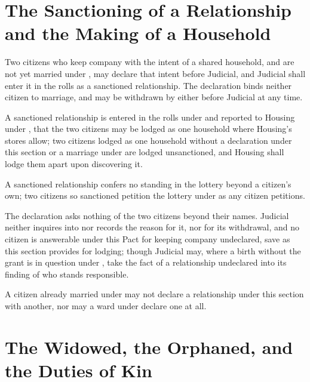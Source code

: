\section{The Sanctioning of a Relationship and the Making of a Household}
\label{sec:marriage:sanctioning-of-a-relationship-and-the-making-of-a-household}

Two citizens who keep company with the intent of a shared household, and are not yet married under , may declare that intent before Judicial, and Judicial shall enter it in the rolls as a sanctioned relationship. The declaration binds neither citizen to marriage, and may be withdrawn by either before Judicial at any time.

\begin{clauses}
\item A sanctioned relationship is entered in the rolls under  and reported to Housing under , that the two citizens may be lodged as one household where Housing's stores allow; two citizens lodged as one household without a declaration under this section or a marriage under  are lodged unsanctioned, and Housing shall lodge them apart upon discovering it.
\item A sanctioned relationship confers no standing in the lottery beyond a citizen's own; two citizens so sanctioned petition the lottery under  as any citizen petitions.
\item The declaration asks nothing of the two citizens beyond their names. Judicial neither inquires into nor records the reason for it, nor for its withdrawal, and no citizen is answerable under this Pact for keeping company undeclared, save as this section provides for lodging; though Judicial may, where a birth without the grant is in question under , take the fact of a relationship undeclared into its finding of who stands responsible.
\item A citizen already married under  may not declare a relationship under this section with another, nor may a ward under  declare one at all.
\end{clauses}

\section{The Widowed, the Orphaned, and the Duties of Kin}
\label{sec:marriage:widowed-the-orphaned-and-the-duties-of-kin}

